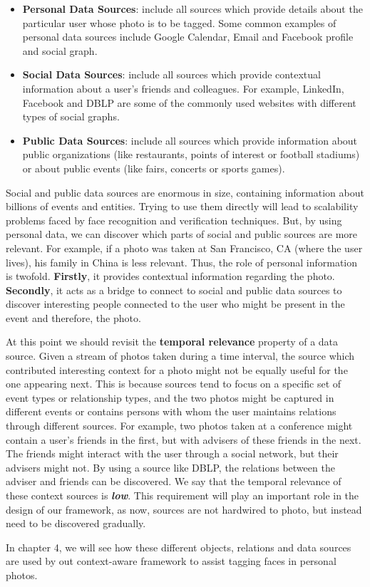 \begin{itemize}
\item \textbf{Personal Data Sources}: include all sources which provide details about the particular user whose photo is to be tagged. Some common examples of personal data sources include Google Calendar, Email and Facebook profile and social graph.
\item \textbf{Social Data Sources}: include all sources which provide contextual information about a user's friends and colleagues. For example, LinkedIn, Facebook and DBLP are some of the commonly used websites with different types of social graphs.
\item \textbf{Public Data Sources}: include all sources which provide information about public organizations (like restaurants, points of interest or football stadiums) or about public events (like fairs, concerts or sports games).
\end{itemize}

Social and public data sources are enormous in size, containing information about billions of events and entities. Trying to use them directly will lead to scalability problems faced by face recognition and verification techniques. But, by using personal data, we can discover which parts of social and public sources are more relevant. For example, if a photo was taken at San Francisco, CA (where the user lives), his family in China is less relevant. Thus, the role of personal information is twofold. \textbf{Firstly}, it provides contextual information regarding the photo. \textbf{Secondly}, it acts as a bridge to connect to social and public data sources to discover interesting people connected to the user who might be present in the event and therefore, the photo.

At this point we should revisit the \textbf{temporal relevance} property of a data source. Given a stream of photos taken during a time interval, the source which contributed interesting context for a photo might not be equally useful for the one appearing next. This is because sources tend to focus on a specific set of event types or relationship types, and the two photos might be captured in different events or contains persons with whom the user maintains relations through different sources. For example, two photos taken at a conference might contain a user's friends in the first, but with advisers of these friends in the next. The friends might interact with the user through a social network, but their advisers might not. By using a source like DBLP, the relations between the adviser and friends can be discovered. We say that the temporal relevance of these context sources is \textbf{\textit{low}}. This requirement will play an important role in the design of our framework, as now, sources are not hardwired to photo, but instead need to be discovered gradually.

In chapter 4, we will see how these different objects, relations and data sources are used by out context-aware framework to assist tagging faces in personal photos.